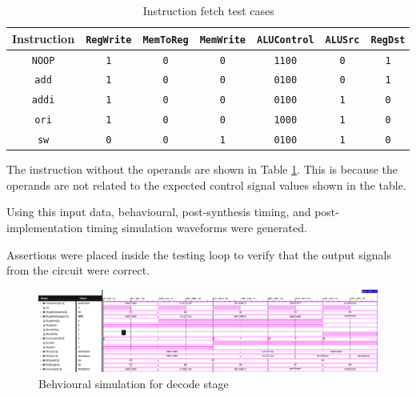\documentclass[CMPE]{../KGCOEReport}
\def\code#1{\texttt{#1}}
\begin{document}
    \begin{table}[H]
        \renewcommand{\arraystretch}{1.2}
        \caption{Instruction fetch test cases}
        \begin{center}
            \begin{tabular}{|c|c|c|c|c|c|c|}
                \hline
                Instruction & \code{RegWrite} & \code{MemToReg} & \code{MemWrite} & \code{ALUControl} & \code{ALUSrc} & \code{RegDst}\\\hline
                \hline
               	\code{NOOP} & \code{1} & \code{0} & \code{0} & \code{1100} & \code{0} & \code{1}\\\hline
               	
               	\code{add} & \code{1} & \code{0} & \code{0} & \code{0100} & \code{0} & \code{1}\\\hline
               	
               	\code{addi} & \code{1} & \code{0} & \code{0} & \code{0100} & \code{1} & \code{0}\\\hline
               	
               	\code{ori} & \code{1} & \code{0} & \code{0} & \code{1000} & \code{1} & \code{0}\\\hline
               	
               	\code{sw} & \code{0} & \code{0} & \code{1} & \code{0100} & \code{1} & \code{0}\\\hline
               	
            \end{tabular}
        \end{center}
        \label{tab:decode}
    \end{table}

	The instruction without the operands are shown in Table \ref{tab:decode}.
	This is because the operands are not related to the expected control
	signal values shown in the table.
	
	Using this input data, behavioural, post-synthesis timing, and
	post-implementation timing simulation waveforms were generated.
	
	Assertions were placed inside the testing loop to verify that the
	output signals from the circuit were correct.
	
	\begin{figure}[h!]
        \centering
        \includegraphics[width=\textwidth]{img/synthesis_decode}
        \caption{Behvioural simulation for decode stage}
        \label{fig:behave_decode}
    \end{figure}
\end{document}
